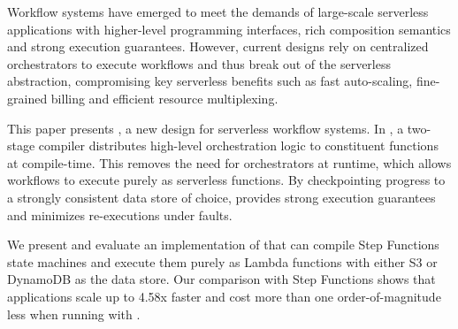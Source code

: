 Workflow systems  have emerged to meet the demands of large-scale serverless
applications with higher-level programming interfaces, rich composition
semantics and strong execution guarantees. However, current designs rely on
centralized orchestrators to execute workflows and thus break out of
the serverless abstraction, compromising key serverless benefits such as fast
auto-scaling, fine-grained billing and efficient resource multiplexing.

This paper presents \name{}, a new design for serverless workflow systems.
In \name{}, a two-stage compiler distributes high-level orchestration
logic to constituent functions at compile-time.
This removes the need for orchestrators at runtime, which allows workflows to
execute purely as serverless functions.
By checkpointing progress to a strongly consistent data store
of choice, \name{} provides strong execution guarantees
and minimizes re-executions under faults.

We present and evaluate an implementation of \name{} that can compile Step
Functions state machines and execute them purely as Lambda functions with
either S3 or DynamoDB as the data store. Our comparison with Step Functions
shows that applications scale up to 4.58x faster and cost more than one
order-of-magnitude less when running with \name{}.
